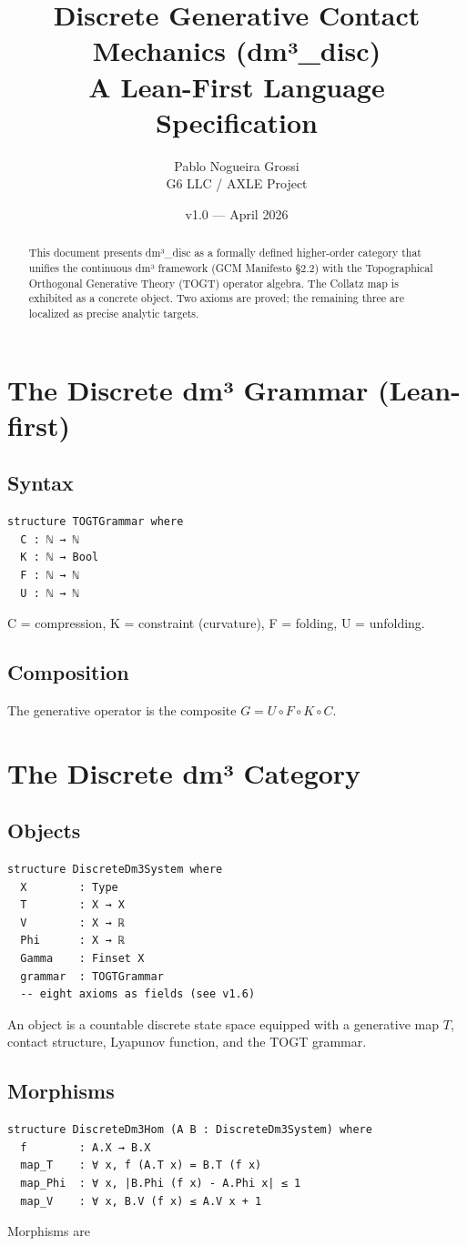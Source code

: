 \documentclass[11pt,a4paper]{article}
\title{\textbf{Discrete Generative Contact Mechanics (dm³\_disc)}\\
A Lean-First Language Specification}
\author{Pablo Nogueira Grossi \\ G6 LLC / AXLE Project}
\date{v1.0 — April 2026}
\begin{document}
\maketitle

\begin{abstract}
This document presents dm³\_disc as a formally defined higher-order category that unifies the continuous dm³ framework (GCM Manifesto §2.2) with the Topographical Orthogonal Generative Theory (TOGT) operator algebra. The Collatz map is exhibited as a concrete object. Two axioms are proved; the remaining three are localized as precise analytic targets.
\end{abstract}

\section{The Discrete dm³ Grammar (Lean-first)}

\subsection{Syntax}
\begin{lstlisting}
structure TOGTGrammar where
  C : ℕ → ℕ
  K : ℕ → Bool
  F : ℕ → ℕ
  U : ℕ → ℕ
\end{lstlisting}
C = compression, K = constraint (curvature), F = folding, U = unfolding.

\subsection{Composition}
The generative operator is the composite \(G = U \circ F \circ K \circ C\).

\section{The Discrete dm³ Category}

\subsection{Objects}
\begin{lstlisting}
structure DiscreteDm3System where
  X        : Type
  T        : X → X
  V        : X → ℝ
  Phi      : X → ℝ
  Gamma    : Finset X
  grammar  : TOGTGrammar
  -- eight axioms as fields (see v1.6)
\end{lstlisting}
An object is a countable discrete state space equipped with a generative map \(T\), contact structure, Lyapunov function, and the TOGT grammar.

\subsection{Morphisms}
\begin{lstlisting}
structure DiscreteDm3Hom (A B : DiscreteDm3System) where
  f        : A.X → B.X
  map_T    : ∀ x, f (A.T x) = B.T (f x)
  map_Phi  : ∀ x, |B.Phi (f x) - A.Phi x| ≤ 1
  map_V    : ∀ x, B.V (f x) ≤ A.V x + 1
\end{lstlisting}
Morphisms are
\end{document}
